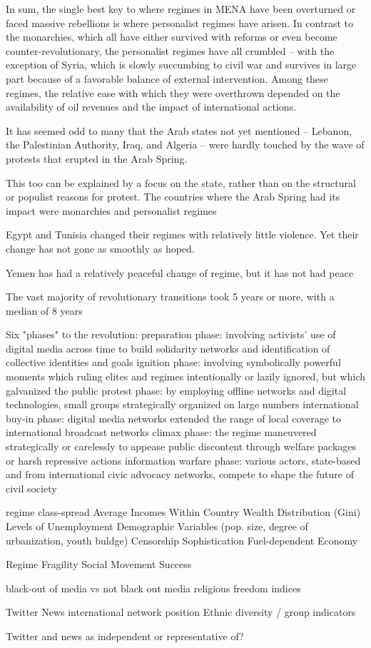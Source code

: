 In sum, the single best key to where regimes in MENA have been overturned or faced massive rebellions is where personalist regimes have arisen. In contrast to the monarchies, which all have either survived with reforms or even become counter-revolutionary, the personalist regimes have all crumbled – with the exception of Syria, which is slowly succumbing to civil war and survives in large part because of a favorable balance of external intervention.
Among these regimes, the relative ease with which they were overthrown depended on the availability of oil revenues and the impact of international actions.


It has seemed odd to many that the Arab states not yet mentioned – Lebanon, the Palestinian Authority, Iraq, and Algeria – were hardly touched by the wave of protests that erupted in the Arab Spring.

This too can be explained by a focus on the state, rather than on the structural or populist reasons for protest. The countries where the Arab Spring had its impact were monarchies and personalist regimes

Egypt and Tunisia changed their regimes with relatively little violence. Yet their change has not gone as smoothly as hoped.

Yemen has had a relatively peaceful change of regime, but it has not had peace

The vast majority of revolutionary transitions took 5 years or more, with a median of 8 years



Six "phases" to the revolution:
	preparation phase: involving activists’ use of digital media across time to build solidarity networks and identification of collective identities and goals
	ignition phase: involving symbolically powerful moments which ruling elites and regimes intentionally or lazily ignored, but which galvanized the public
	protest phase: by employing offline networks and digital technologies, small groups strategically organized on large numbers
	international buy-in phase: digital media networks extended the range of local coverage to international broadcast networks
	climax phase:  the regime maneuvered strategically or carelessly to appease public discontent through welfare packages or harsh repressive actions
	information warfare phase: various actors, state-based and from international civic advocacy networks, compete to shape the future of civil society
	

regime 
class-spread
Average Incomes Within Country
Wealth Distribution (Gini)
Levels of Unemployment
Demographic Variables (pop. size, degree of urbanization, youth buldge)
Censorship Sophistication 
Fuel-dependent Economy 

Regime Fragility 	
Social Movement Success 

black-out of media vs not black out media 
religious freedom indices

Twitter
News 
international network position
Ethnic diversity / group indicators

Twitter and news as independent or representative of?


